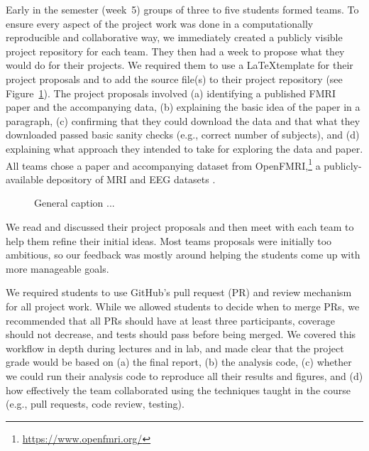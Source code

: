 Early in the semester (week~5) groups of three to five students formed teams.
To ensure every aspect of the project work was done in a computationally
reproducible and collaborative way, we immediately created a publicly visible
project repository for each team.
They then had a week to propose what they would do for their projects.
We required them to use a \LaTeX template for their project proposals
and to add the source file(s) to their project repository (see Figure~\ref{fig:repo}).
The project proposals involved
(a) identifying a published FMRI paper and the accompanying data,
(b) explaining the basic idea of the paper in a paragraph,
(c) confirming that they could download the data and that what they
downloaded passed basic sanity checks (e.g., correct number of subjects), and
(d) explaining what approach they intended to take for exploring
the data and paper.
All teams chose a paper and accompanying dataset from
OpenFMRI,\footnote{\url{https://www.openfmri.org/}} a publicly-available
depository of MRI and EEG datasets
\citep{poldrack2013toward,poldrack2015openfmri}.


\begin{figure}
\centering

\caption{General caption ...}
\label{fig:repo}
\end{figure}

We read and discussed their project proposals and then meet with each
team to help them refine their initial ideas.
Most teams proposals were initially too ambitious, so our feedback
was mostly around helping the students come up with more manageable
goals.

We required students to use GitHub's pull request (PR) and review mechanism
for all project work.
While we allowed students to decide when to merge PRs, we recommended that
all PRs should have at least three participants, coverage should not decrease,
and tests should pass before being merged.
We covered this workflow in depth during lectures and in lab,
and made clear that the project grade would be based on
(a) the final report,
(b) the analysis code,
(c) whether we could run their analysis code to reproduce all
their results and figures, and
(d) how effectively the team collaborated using the techniques
taught in the course (e.g., pull requests, code review, testing).

